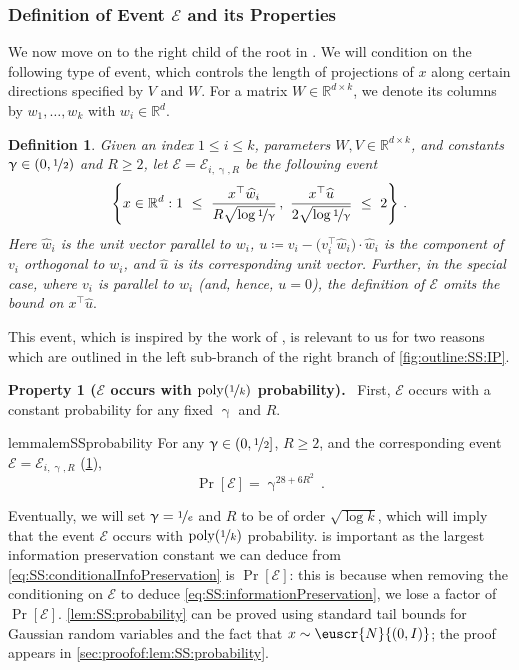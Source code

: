\documentclass[11pt,letterpaper]{article}
\theoremstyle{plain}
\newtheorem{definition}{Definition}
\theoremstyle{definition}
\theoremstyle{remark}
\newcommand{\inparen}[1]{\ensuremath{\left(#1\right)}}
\newcommand{\R}{\mathbb{R}}
\newcommand{\evE}{\ensuremath{\mathscr{E}}}
\newcommand{\nfrac}[2]{\nicefrac{#1}{#2}}
\newcommand{\poly}{\mathrm{poly}}
\newcommand{\wh}[1]{\widehat{#1}}
\newcommand{\customcal}[1]{\euscr{#1}}
\newcommand{\cN}{\customcal{N}}
\renewcommand{\paragraph}[1]{\medskip \noindent\textbf{#1}~}
\renewcommand{\gamma}{\upgamma}
\newcommand{\normal}[2]{\cN{\inparen{#1,#2}}}
\begin{document}
{{    \subsubsection{Definition of Event $\evE$ and its Properties}
    We now move on to the right child of the root in .
    We will condition on the following type of event, which controls the length of projections of $x$ along certain directions {specified by} $V$ and $W$.
    For a matrix $W \in \R^{d \times k}$, we denote {its columns by $w_1,\dots,w_k$ with $w_i \in \R^d$.}
    \begin{definition}\label{def:SS:event}
        Given an index $1\leq i\leq k$, 
        parameters $W,V\in \R^{d\times k}$, and 
        constants $\gamma\in (0,\nfrac{1}{2})$ and $R\geq 2$, 
        let $\evE=\evE_{i,\gamma,R}$ be the following event 
        \[
           {\left\{ x \in \R^d :  1 ~\leq~ 
            \frac{{x{^\top} \wh{w}_i}}{
                R\sqrt{\log{\nfrac{1}{\gamma}}}
            }\,,
            ~
            \frac{{x{^\top} \wh{u}}}{
                2\sqrt{\log{\nfrac{1}{\gamma}}}
            }
            ~\leq~ 2 \right\}\,.}
        \]
        Here {$\wh w_i$ is the unit vector parallel to $w_i$,}
        $u\coloneqq v_i - {(v_i^\top \wh{w}_i}) \cdot \wh{w}_i$ is the component of $v_i$ orthogonal to $w_i${, and $\wh u$ is its corresponding unit vector}.
        Further, in the special case, where $v_i$ is parallel to $w_i$ (and, hence, $u=0$), the definition of $\evE$ omits the bound on ${x^\top \wh{u}}.$
    \end{definition}
    This event, {which is inspired by the work of \cite{gaitonde2024selfselection},} is relevant to us for two reasons {which are outlined in the left sub-branch of the right branch of \cref{fig:outline:SS:IP}.}
    
    \paragraph{Property 1 ($\evE$ occurs with {$\poly(\nfrac{1}{k})$} probability).} 
        First, $\evE$ occurs with a constant probability for any fixed $\gamma$ and $R$.
        \begin{restatable}[]{lemma}{lemSSprobability}
            \label{lem:SS:probability}
            For any $\gamma\in (0,\nfrac{1}{2}]$, $R\geq 2$, and the corresponding event $\evE=\evE_{i,\gamma,R}$ (\cref{def:SS:event}), 
            \[
                \Pr[\evE] = \gamma^{28+6R^2}\,.
            \]
        \end{restatable} 
        {Eventually, we will set $\gamma = \nfrac{1}{e}$ and $R$ to be of order $\sqrt{\log k}$, which will imply that the event $\evE$ occurs with $\poly(\nfrac{1}{k})$ probability.}
         is important as the largest information preservation constant we can deduce from \cref{eq:SS:conditionalInfoPreservation} is $\Pr[\evE]$: this is because when removing the conditioning on $\evE$ to deduce \cref{eq:SS:informationPreservation}, we lose a factor of $\Pr[\evE]$.
        \cref{lem:SS:probability} can be proved using standard tail bounds for Gaussian random variables and the fact that $x\sim \normal{0}{I}$; the proof appears in \cref{sec:proofof:lem:SS:probability}.

}}
\end{document}
